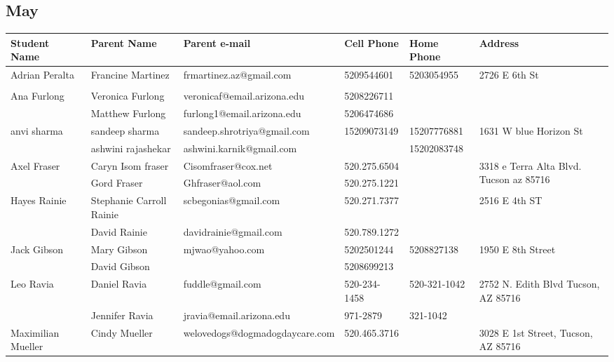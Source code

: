 \documentclass[landscape]{article}\usepackage[]{graphicx}\usepackage[]{color}
\begin{document}
\subsection{May}
\begin{longtable}{|p{100pt}|p{100pt}|p{140pt}|p{60pt}|p{64pt}|p{120pt}|}
\textbf{Student Name} & \textbf{Parent Name} & \textbf{Parent e-mail} & \textbf{Cell Phone} & \textbf{Home Phone} & \textbf{Address}\\
\hline
\hline
\multirow{2}{100pt}{Adrian Peralta} & Francine Martinez & frmartinez.az@gmail.com & 5209544601 & 5203054955 & \multirow{2}{120pt}{2726 E 6th St} \\
 &  &  &  &  & \\
\hline
\multirow{2}{100pt}{Ana Furlong} & Veronica Furlong & veronicaf@email.arizona.edu & 5208226711 &  & \multirow{2}{120pt}{} \\
 & Matthew Furlong & furlong1@email.arizona.edu & 5206474686 &  & \\
\hline
\multirow{2}{100pt}{anvi sharma} & sandeep sharma & sandeep.shrotriya@gmail.com & 15209073149 & 15207776881 & \multirow{2}{120pt}{1631 W blue Horizon St} \\
 & ashwini rajashekar & ashwini.karnik@gmail.com &  & 15202083748 & \\
\hline
\multirow{2}{100pt}{Axel Fraser} & Caryn Isom fraser & Cisomfraser@cox.net & 520.275.6504 &  & \multirow{2}{120pt}{3318 e Terra Alta Blvd. Tucson az 85716 } \\
 & Gord Fraser  & Ghfraser@aol.com & 520.275.1221 &  & \\
\hline
\multirow{2}{100pt}{Hayes Rainie} & Stephanie Carroll Rainie & scbegonias@gmail.com & 520.271.7377 &  & \multirow{2}{120pt}{2516 E 4th ST} \\
 & David Rainie & davidrainie@gmail.com & 520.789.1272 &  & \\
\hline
\multirow{2}{100pt}{Jack Gibson} & Mary Gibson & mjwao@yahoo.com & 5202501244 & 5208827138 & \multirow{2}{120pt}{1950 E 8th Street} \\
 & David Gibson &  & 5208699213 &  & \\
\hline
\multirow{2}{100pt}{Leo Ravia} & Daniel Ravia & fuddle@gmail.com & 520-234-1458 & 520-321-1042 & \multirow{2}{120pt}{2752 N. Edith Blvd Tucson, AZ 85716} \\
 & Jennifer Ravia & jravia@email.arizona.edu & 971-2879 & 321-1042 & \\
\hline
\multirow{2}{100pt}{Maximilian Mueller} & Cindy Mueller & welovedogs@dogmadogdaycare.com & 520.465.3716 &  & \multirow{2}{120pt}{3028 E 1st Street, Tucson, AZ 85716} \\

\end{longtable}
\end{document}
